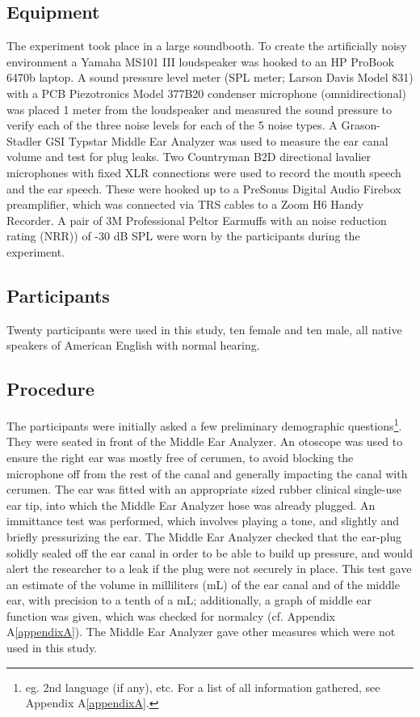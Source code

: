   
\subsection{Equipment}

The experiment took place in a large soundbooth.  To create the artificially noisy environment a Yamaha MS101 III loudspeaker was hooked to an HP ProBook 6470b laptop.  A sound pressure level meter (SPL meter; Larson Davis Model 831) with a PCB Piezotronics Model 377B20 condenser microphone (omnidirectional) was placed 1 meter from the loudspeaker and measured the sound pressure to verify each of the three noise levels for each of the 5 noise types. A Grason-Stadler GSI Typstar Middle Ear Analyzer was used to measure the ear canal volume and test for plug leaks.  Two Countryman B2D directional lavalier microphones with fixed XLR connections were used to record the mouth speech and the ear speech.  These were hooked up to a PreSonus Digital Audio Firebox preamplifier, which was connected via TRS cables to a Zoom H6 Handy Recorder. A pair of 3M Professional Peltor Earmuffs with an noise reduction rating (NRR)) of -30 dB SPL were worn by the participants during the experiment.


\subsection{Participants}
Twenty participants were used in this study, ten female and ten male, all native speakers of American English with normal hearing.

\subsection{Procedure}\label{chap2:methods:procedure}

The participants were initially asked a few preliminary demographic questions\footnote{eg. 2nd language (if any), etc. For a list of all information gathered, see Appendix A\ref{appendixA}.}. They were seated in front of the Middle Ear Analyzer.  An otoscope was used to ensure the right ear was mostly free of cerumen, to avoid blocking the microphone off from the rest of the canal and generally impacting the canal with cerumen.  The ear was fitted with an appropriate sized rubber clinical single-use ear tip, into which the Middle Ear Analyzer hose was already plugged.  An immittance test was performed, which involves playing a tone, and slightly and briefly pressurizing the ear.  The Middle Ear Analyzer checked that the ear-plug solidly sealed off the ear canal in order to be able to build up pressure, and would alert the researcher to a leak if the plug were not securely in place.  This test gave an estimate of the volume in milliliters (mL) of the ear canal and of the middle ear, with precision to a tenth of a mL; additionally, a graph of middle ear function was given, which was checked for normalcy (cf. Appendix A\ref{appendixA}).  The Middle Ear Analyzer gave other measures which were not used in this study.

